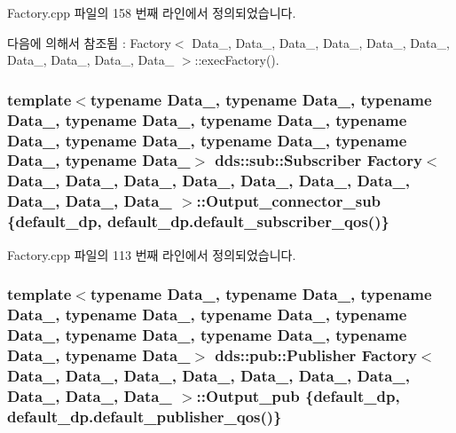 Factory.\+cpp 파일의 158 번째 라인에서 정의되었습니다.



다음에 의해서 참조됨 \+:  Factory$<$ Data\+\_, Data\+\_, Data\+\_, Data\+\_, Data\+\_, Data\+\_, Data\+\_, Data\+\_, Data\+\_, Data\+\_ $>$\+::exec\+Factory().

\subsubsection[{\texorpdfstring{Output\+\_\+connector\+\_\+sub}{Output_connector_sub}}]{\setlength{\rightskip}{0pt plus 5cm}template$<$typename Data\+\_, typename Data\+\_, typename Data\+\_, typename Data\+\_, typename Data\+\_, typename Data\+\_, typename Data\+\_, typename Data\+\_, typename Data\+\_, typename Data\+\_$>$ dds\+::sub\+::\+Subscriber {\bf Factory}$<$ Data\+\_, Data\+\_, Data\+\_, Data\+\_, Data\+\_, Data\+\_, Data\+\_, Data\+\_, Data\+\_, Data\+\_ $>$\+::Output\+\_\+connector\+\_\+sub \{{\bf default\+\_\+dp}, default\+\_\+dp.\+default\+\_\+subscriber\+\_\+qos()\}}\hypertarget{classFactory_a2b0fe17e9fe543b0dc41c3898293ae3e}{}\label{classFactory_a2b0fe17e9fe543b0dc41c3898293ae3e}


Factory.\+cpp 파일의 113 번째 라인에서 정의되었습니다.

\subsubsection[{\texorpdfstring{Output\+\_\+pub}{Output_pub}}]{\setlength{\rightskip}{0pt plus 5cm}template$<$typename Data\+\_, typename Data\+\_, typename Data\+\_, typename Data\+\_, typename Data\+\_, typename Data\+\_, typename Data\+\_, typename Data\+\_, typename Data\+\_, typename Data\+\_$>$ dds\+::pub\+::\+Publisher {\bf Factory}$<$ Data\+\_, Data\+\_, Data\+\_, Data\+\_, Data\+\_, Data\+\_, Data\+\_, Data\+\_, Data\+\_, Data\+\_ $>$\+::Output\+\_\+pub \{{\bf default\+\_\+dp}, default\+\_\+dp.\+default\+\_\+publisher\+\_\+qos()\}}\hypertarget{classFactory_a6a48290339d13731e356940e7d29db00}{}\label{classFactory_a6a48290339d13731e356940e7d29db00}


